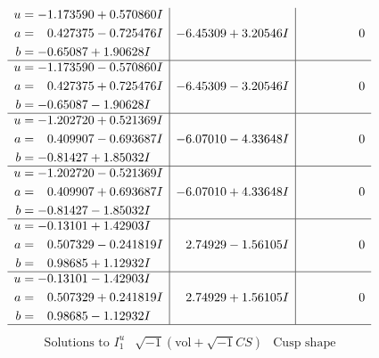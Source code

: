 \documentclass[1p]{elsarticle_modified}
\theoremstyle{definition}
\newcommand{\I}{\sqrt{-1}}
\begin{document}
$$\begin{array}{c|c|c}
\begin{aligned}
u &= -1.173590 + 0.570860 I \\
a &= \phantom{-}0.427375 - 0.725476 I \\
b &= -0.65087 + 1.90628 I\end{aligned}
 & -6.45309 + 3.20546 I & \phantom{-0.000000 } 0 \\ \hline\begin{aligned}
u &= -1.173590 - 0.570860 I \\
a &= \phantom{-}0.427375 + 0.725476 I \\
b &= -0.65087 - 1.90628 I\end{aligned}
 & -6.45309 - 3.20546 I & \phantom{-0.000000 } 0 \\ \hline\begin{aligned}
u &= -1.202720 + 0.521369 I \\
a &= \phantom{-}0.409907 - 0.693687 I \\
b &= -0.81427 + 1.85032 I\end{aligned}
 & -6.07010 - 4.33648 I & \phantom{-0.000000 } 0 \\ \hline\begin{aligned}
u &= -1.202720 - 0.521369 I \\
a &= \phantom{-}0.409907 + 0.693687 I \\
b &= -0.81427 - 1.85032 I\end{aligned}
 & -6.07010 + 4.33648 I & \phantom{-0.000000 } 0 \\ \hline\begin{aligned}
u &= -0.13101 + 1.42903 I \\
a &= \phantom{-}0.507329 - 0.241819 I \\
b &= \phantom{-}0.98685 + 1.12932 I\end{aligned}
 & \phantom{-}2.74929 - 1.56105 I & \phantom{-0.000000 } 0 \\ \hline\begin{aligned}
u &= -0.13101 - 1.42903 I \\
a &= \phantom{-}0.507329 + 0.241819 I \\
b &= \phantom{-}0.98685 - 1.12932 I\end{aligned}
 & \phantom{-}2.74929 + 1.56105 I & \phantom{-0.000000 } 0\\
 \hline 
 \end{array}$$\newpage$$\begin{array}{c|c|c}  
\text{Solutions to }I^u_{1}& \I (\text{vol} + \sqrt{-1}CS) & \text{Cusp shape}\\
 \hline 
\begin{aligned}

\end{aligned}
\end{array}$$
\end{document}
